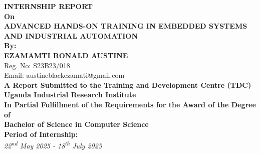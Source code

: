 \documentclass[12pt,a4paper]{report}
\begin{document}

\begin{titlepage}
    \centering
    \vspace*{-0.5cm}
    
    \par
    \vspace{1.5cm}
    
    {\fontsize{18}{21.6}\selectfont\bfseries INTERNSHIP REPORT}\\[0.5cm]
    
    {\fontsize{14}{16.8}\selectfont\bfseries On}\\[0.4cm]
    
    {\fontsize{16}{19.2}\selectfont\bfseries ADVANCED HANDS-ON TRAINING IN EMBEDDED SYSTEMS AND INDUSTRIAL AUTOMATION}\\[1.2cm]
    
    {\fontsize{14}{16.8}\selectfont\bfseries By:}\\[0.4cm]
    {\fontsize{16}{19.2}\selectfont\bfseries EZAMAMTI RONALD AUSTINE}\\[0.3cm]
    {\fontsize{12}{16.8}\selectfont Reg. No: S23B23/018}\\[0.2cm]
    {\fontsize{12}{16.8}\selectfont Email: austineblackezamati@gmail.com}\\[1.2cm]
    
    {\fontsize{14}{16.8}\selectfont\bfseries A Report Submitted to the Training and Development Centre (TDC)}\\[0.3cm]
    {\fontsize{14}{16.8}\selectfont\bfseries Uganda Industrial Research Institute}\\[0.5cm]
    
    {\fontsize{12}{16.8}\selectfont\bfseries In Partial Fulfillment of the Requirements for the Award of the Degree of}\\[0.2cm]
    {\fontsize{12}{16.8}\selectfont\bfseries Bachelor of Science in Computer Science}\\[1.5cm]
    
    {\fontsize{14}{16.8}\selectfont\bfseries Period of Internship:}\\[0.3cm]
    {\fontsize{12}{16.8}\selectfont\textit{22\textsuperscript{nd} May 2025 - 18\textsuperscript{th} July 2025}}\\[1cm]

\end{titlepage}
\end{document}
